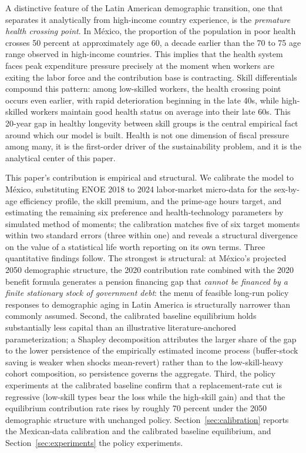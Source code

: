 \documentclass[12pt,a4paper]{article}
\begin{document}
A distinctive feature of the Latin American demographic transition, one that separates it analytically from high-income country experience, is the \textit{premature health crossing point}. In M\'exico, the proportion of the population in poor health crosses 50 percent at approximately age 60, a decade earlier than the 70 to 75 age range observed in high-income countries. This implies that the health system faces peak expenditure pressure precisely at the moment when workers are exiting the labor force and the contribution base is contracting. Skill differentials compound this pattern: among low-skilled workers, the health crossing point occurs even earlier, with rapid deterioration beginning in the late 40s, while high-skilled workers maintain good health status on average into their late 60s. This 20-year gap in healthy longevity between skill groups is the central empirical fact around which our model is built. Health is not one dimension of fiscal pressure among many, it is the first-order driver of the sustainability problem, and it is the analytical center of this paper.

This paper's contribution is empirical and structural. We calibrate the model to M\'exico, substituting ENOE 2018 to 2024 labor-market micro-data for the sex-by-age efficiency profile, the skill premium, and the prime-age hours target, and estimating the remaining six preference and health-technology parameters by simulated method of moments; the calibration matches five of six target moments within two standard errors (three within one) and reveals a structural divergence on the value of a statistical life worth reporting on its own terms. Three quantitative findings follow. The strongest is structural: at M\'exico's projected 2050 demographic structure, the 2020 contribution rate combined with the 2020 benefit formula generates a pension financing gap that \textit{cannot be financed by a finite stationary stock of government debt}: the menu of feasible long-run policy responses to demographic aging in Latin America is structurally narrower than commonly assumed. Second, the calibrated baseline equilibrium holds substantially less capital than an illustrative literature-anchored parameterization; a Shapley decomposition attributes the larger share of the gap to the lower persistence of the empirically estimated income process (buffer-stock saving is weaker when shocks mean-revert) rather than to the low-skill-heavy cohort composition, so persistence governs the aggregate. Third, the policy experiments at the calibrated baseline confirm that a replacement-rate cut is regressive (low-skill types bear the loss while the high-skill gain) and that the equilibrium contribution rate rises by roughly 70 percent under the 2050 demographic structure with unchanged policy. Section~\ref{sec:calibration} reports the Mexican-data calibration and the calibrated baseline equilibrium, and Section~\ref{sec:experiments} the policy experiments.
\end{document}

